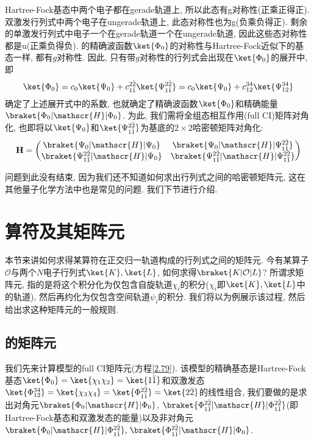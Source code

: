 Hartree-Fock基态中两个电子都在gerade轨道上, 
所以此态有g对称性(正乘正得正). 
双激发行列式中两个电子在ungerade轨道上, 
此态对称性也为g(负乘负得正). 
剩余的单激发行列式中电子一个在gerade轨道一个在ungerade轨道, 
因此这些态对称性都是u(正乘负得负). 
的精确波函数$\ket{\Phi_0}$的对称性与Hartree-Fock近似下的基态一样, 
都有$g$对称性. 
因此, 
只有带$g$对称性的行列式会出现在$\ket{\Phi_0}$的展开中, 
即
\begin{equation}
\ket{\Phi_0}=c_0\ket{\Psi_0} + c_{1\bar{1}}^{2\bar{2}}\ket{\Psi_{1\bar{1}}^{2\bar{2}}}=c_0\ket{\Psi_0} + c_{12}^{34}\ket{\Psi_{12}^{34}}
\end{equation}
确定了上述展开式中的系数, 
也就确定了精确波函数$\ket{\Phi_0}$和精确能量$\braket{\Phi_0|\mathscr{H}|\Phi_0}$. 
为此, 
我们需将全组态相互作用(full CI)矩阵对角化, 
也即将以$\ket{\Psi_0}$和$\ket{\Psi_{1\bar{1}}^{2\bar{2}}}$为基底的$2\times 2$哈密顿矩阵对角化:
\begin{equation}
	\label{2.79}
	\mathbf{H}=
	\begin{pmatrix}
		\braket{{\Psi_0}|\mathscr{H} | {\Psi_0}} & \braket{{\Psi_0} |\mathscr{H} |{\Psi_{1\bar{1}}^{2\bar{2}}}}\\
		\braket{{\Psi_{1\bar{1}}^{2\bar{2}}}|\mathscr{H} | {\Psi_0}} & \braket{{\Psi_{1\bar{1}}^{2\bar{2}}} |\mathscr{H} |{\Psi_{1\bar{1}}^{2\bar{2}}}}
	\end{pmatrix}
\end{equation}

问题到此没有结束, 
因为我们还不知道如何求出行列式之间的哈密顿矩阵元, 
这在其他量子化学方法中也是常见的问题. 
我们下节进行介绍.


\section{算符及其矩阵元 }
 \label{sec2.3}
本节来讲如何求得某算符在正交归一轨道构成的行列式之间的矩阵元. 
今有某算子$\mathcal{O}$与两个$N$电子行列式$\ket{K},\ket{L}$, 
如何求得$\braket{K|\mathcal{O}|L}$? 所谓求矩阵元, 
指的是将这个积分化为仅包含自旋轨道$\chi_i$的积分($\chi_i$即$\ket{K},\ket{L}$中的轨道), 
然后再约化为仅包含空间轨道$\psi_i$的积分. 
 我们将以为例展示该过程, 
然后给出求这种矩阵元的一般规则.


\subsection{的矩阵元}
 \label{sec2.3.1}
我们先来计算模型的full CI矩阵元(方程\autoref{2.79}). 
该模型的精确基态是Hartree-Fock基态$\ket{\Phi_0}=\ket{\chi_1\chi_2}=\ket{1\bar{1}}$和双激发态$\ket{\Phi_{12}^{34}}=\ket{\chi_3\chi_4}=\ket{\Phi_{1\bar{1}}^{2\bar{2}}}=\ket{2\bar{2}}$的线性组合, 
我们要做的是求出对角元$\braket{{\Phi_0}|\mathscr{H} | {\Phi_0}}$, 
$\braket{{\Phi_{1\bar{1}}^{2\bar{2}}} |\mathscr{H} |{\Phi_{1\bar{1}}^{2\bar{2}}}}$(即Hartree-Fock基态和双激发态的能量)以及非对角元$\braket{{\Phi_0} |\mathscr{H} |{\Phi_{1\bar{1}}^{2\bar{2}}}},$$\,\braket{{\Phi_{1\bar{1}}^{2\bar{2}}}|\mathscr{H} | {\Phi_0}}$.


